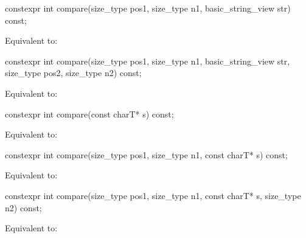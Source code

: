%
\begin{itemdecl}
constexpr int compare(size_type pos1, size_type n1, basic_string_view str) const;
\end{itemdecl}

\begin{itemdescr}
\pnum
\effects
Equivalent to: 
\end{itemdescr}

%
\begin{itemdecl}
constexpr int compare(size_type pos1, size_type n1, basic_string_view str,
                      size_type pos2, size_type n2) const;
\end{itemdecl}

\begin{itemdescr}
\pnum
\effects
Equivalent to: 
\end{itemdescr}

%
\begin{itemdecl}
constexpr int compare(const charT* s) const;
\end{itemdecl}

\begin{itemdescr}
\pnum
\effects
Equivalent to: 
\end{itemdescr}

%
\begin{itemdecl}
constexpr int compare(size_type pos1, size_type n1, const charT* s) const;
\end{itemdecl}

\begin{itemdescr}
\pnum
\effects
Equivalent to: 
\end{itemdescr}

%
\begin{itemdecl}
constexpr int compare(size_type pos1, size_type n1, const charT* s, size_type n2) const;
\end{itemdecl}

\begin{itemdescr}
\pnum
\effects
Equivalent to: 
\end{itemdescr}

